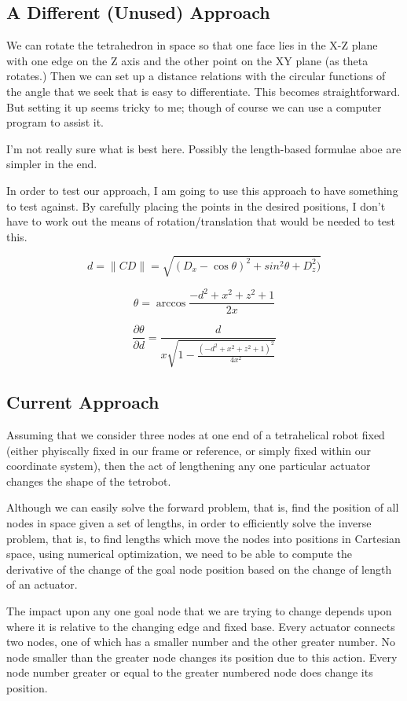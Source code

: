\documentclass[11pt]{article}
\begin{document}
\subsection{A Different (Unused) Approach}

We can rotate the tetrahedron in space so that one face lies in the X-Z plane with
one edge on the Z axis and the other point on the XY plane (as theta rotates.)
Then we can set up a distance relations with the circular
functions of the angle that we seek that is easy to differentiate. This
becomes straightforward. But setting it up seems tricky to me; though
of course we can use a computer program to assist it.

I'm not really sure what is best here. Possibly the length-based formulae
aboe are simpler in the end.

In order to test our approach, I am going to use this approach to have
something to test against.  By carefully placing the points in the desired
positions, I don't have to work out the means of rotation/translation
that would be needed to test this.

\[
d = \|CD \| = \sqrt{(D_x - \cos{\theta})^2 + sin^2{\theta} + D_z^2)}
\]

\[
\theta = \arccos{\frac{-d^2 + x^2 + z^2 + 1}{2 x}}
\]

\[
\frac{\partial \theta }{\partial d}   =  \frac{d}{x \sqrt{1 - \frac{(-d^2 + x^2 + z^2 + 1)^2}{4 x^2}}}
\]

\subsection{Current Approach}

Assuming that we consider three nodes at one end of a tetrahelical robot fixed (either phyiscally fixed in our frame or reference, or simply fixed within
our coordinate system), then the act of lengthening any one particular actuator changes the shape of the tetrobot.


Although we can easily solve the forward problem, that is, find the position of all nodes in space given a set of lengths,
in order to efficiently solve the inverse problem, that is, to find lengths which move the nodes into positions in Cartesian space,
using numerical optimization, we need to be able to compute the derivative of the change of the goal node position based on
the change of length of an actuator.

The impact upon any one goal node that we are trying to change depends upon where it is relative to the changing edge and fixed base.
Every actuator connects two nodes, one of which has a smaller number and the other greater number.
No node smaller than the greater node changes its position due to this action.
Every node number greater or equal to the greater numbered node does change its position.
\end{document}
